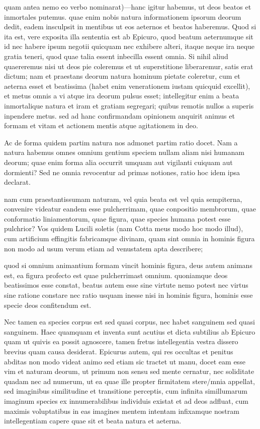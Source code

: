  quam antea nemo eo verbo nominarat)—hanc igitur habemus, ut deos beatos et inmortales putemus. quae enim nobis natura informationem ipsorum deorum dedit, eadem insculpsit in mentibus ut eos aeternos et beatos haberemus. Quod si ita est, vere exposita illa sententia est ab Epicuro, quod beatum aeternumque sit id nec habere ipsum negotii quicquam nec exhibere alteri, itaque neque ira neque gratia teneri, quod quae talia essent inbecilla essent omnia. Si nihil aliud quaereremus nisi ut deos pie coleremus et ut superstitione liberaremur, satis erat dictum; nam et praestans deorum natura hominum pietate coleretur, cum et aeterna esset et beatissima (habet enim venerationem iustam quicquid excellit), et metus omnis a vi atque ira deorum pulsus esset; intellegitur enim a beata inmortalique natura et iram et gratiam segregari; quibus remotis nullos a superis inpendere metus. sed ad hanc confirmandam opinionem anquirit animus et formam et vitam et actionem mentis atque agitationem in deo.

 Ac de forma quidem partim natura nos admonet partim ratio docet. Nam a natura habemus omnes omnium gentium speciem nullam aliam nisi humanam deorum; quae enim forma alia occurrit umquam aut vigilanti cuiquam aut dormienti? Sed ne omnia revocentur ad primas notiones, ratio hoc idem ipsa declarat.

 nam cum praestantissumam naturam, vel quia beata est vel quia sempiterna, convenire videatur eandem esse pulcherrimam, quae conpositio membrorum, quae conformatio liniamentorum, quae figura, quae species humana potest esse pulchrior? Vos quidem Lucili soletis (nam Cotta meus modo hoc modo illud), cum artificium effingitis fabricamque divinam, quam sint omnia in hominis figura non modo ad usum verum etiam ad venustatem apta describere;

 quod si omnium animantium formam vincit hominis figura, deus autem animans est, ea figura profecto est quae pulcherrimast omnium. quoniamque deos beatissimos esse constat, beatus autem esse sine virtute nemo potest nec virtus sine ratione constare nec ratio usquam inesse nisi in hominis figura, hominis esse specie deos confitendum est.

 Nec tamen ea species corpus est sed quasi corpus, nec habet sanguinem sed quasi sanguinem. Haec quamquam et inventa sunt acutius et dicta subtilius ab Epicuro quam ut quivis ea possit agnoscere, tamen fretus intellegentia vestra dissero brevius quam causa desiderat. Epicurus autem, qui res occultas et penitus abditas non modo videat animo sed etiam sic tractet ut manu, docet eam esse vim et naturam deorum, ut primum non sensu sed mente cernatur, nec soliditate quadam nec ad numerum, ut ea quae ille propter firmitatem stere/mnia appellat, sed imaginibus similitudine et transitione perceptis, cum infinita simillumarum imaginum species ex innumerabilibus individuis existat et ad deos adfluat, cum maximis voluptatibus in eas imagines mentem intentam infixamque nostram intellegentiam capere quae sit et beata natura et aeterna.

